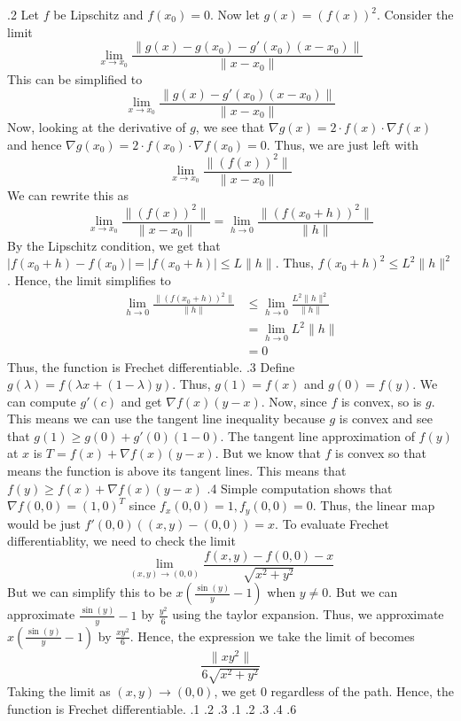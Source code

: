 \documentclass[12pt]{exam}
\begin{document}
\begin{questions}
.2\newline
Let $f$ be Lipschitz and $f(x_0) = 0$. Now let $g(x) = (f(x))^2$. Consider the limit \[\lim_{x \to x_0} \frac{\|g(x)-g(x_0)- g'(x_0)(x-x_0)\|}{\|x-x_0\|}\] This can be simplified to \[\lim_{x \to x_0} \frac{\|g(x)- g'(x_0)(x-x_0)\|}{\|x-x_0\|}\] Now, looking at the derivative of $g$, we see that $\nabla g(x) = 2\cdot f(x) \cdot \nabla f(x)$ and hence $\nabla g(x_0) =  2\cdot f(x_0) \cdot \nabla f(x_0) = 0$. Thus, we are just left with \[\lim_{x \to x_0} \frac{\|(f(x))^2\|}{\|x-x_0\|}\] We can rewrite this as 
\[
    \lim_{x \to x_0} \frac{\|(f(x))^2\|}{\|x-x_0\|} = \lim_{h \to 0} \frac{\|(f(x_0+h))^2\|}{\|h\|}
\]
By the Lipschitz condition, we get that $|f(x_0+h)-f(x_0)| =|f(x_0+h)| \leq L\|h\|$. Thus, $f(x_0+h)^2 \leq L^2\|h\|^2$. Hence, the limit simplifies to 
\begin{align*}
    \lim_{h \to 0} \frac{\|(f(x_0+h))^2\|}{\|h\|} &\leq \lim_{h \to 0} \frac{L^2\|h\|^2}{\|h\|}\\
    &=\lim_{h \to 0} L^2\|h\|\\
    &= 0
\end{align*}
Thus, the function is Frechet differentiable. 
.3 \newline
Define $g(\lambda) = f(\lambda x + (1-\lambda)y)$. Thus, $g(1) = f(x)$ and $g(0) = f(y)$. We can compute $g'(c)$ and get $\nabla f(x)(y-x)$. Now, since $f$ is convex, so is $g$. This means we can use the tangent line inequality because $g$ is convex and see that $g(1) \geq g(0) + g'(0)(1-0)$. The tangent line approximation of $f(y)$ at $x$ is $T = f(x)+\nabla f(x)(y-x)$. But we know that $f$ is convex so that means the function is above its tangent lines. This means that $f(y) \geq f(x) + \nabla f(x) (y-x)$
.4 \newline
Simple computation shows that $\nabla f(0,0) = (1,0)^T$ since $f_x(0,0) = 1, f_y(0,0)=0$. Thus, the linear map would be just $f'(0,0)((x,y)-(0,0)) = x$. To evaluate Frechet differentiablity, we need to check the limit \[\lim_{(x,y)\to(0,0)}\frac{f(x,y)-f(0,0)-x}{\sqrt{x^2+y^2}}\] But we can simplify this to be $x\left(\frac{\sin(y)}{y}-1\right)$ when $y \neq 0$. But we can approximate $\frac{\sin(y)}{y}-1$ by $\frac{y^2}{6}$ using the taylor expansion. Thus, we approximate $x\left(\frac{\sin(y)}{y}-1\right)$ by $\frac{xy^2}{6}$. Hence, the expression we take the limit of becomes \[\frac{\|xy^2\|}{6\sqrt{x^2+y^2}}\] Taking the limit as $(x,y) \to (0,0)$, we get $0$ regardless of the path. Hence, the function is Frechet differentiable. 
.1
.2
.3
.1
.2
.3
.4
.6
\begin{parts}

\end{parts}
\end{questions}
\end{document}
